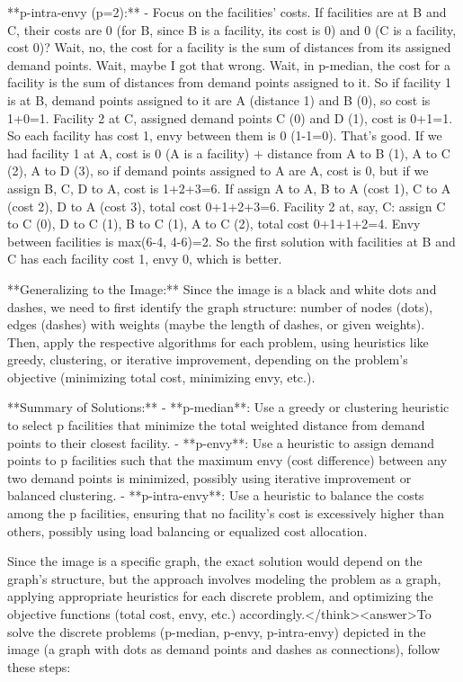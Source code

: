 **p-intra-envy (p=2):**
- Focus on the facilities' costs. If facilities are at B and C, their costs are 0 (for B, since B is a facility, its cost is 0) and 0 (C is a facility, cost 0)? Wait, no, the cost for a facility is the sum of distances from its assigned demand points. Wait, maybe I got that wrong. Wait, in p-median, the cost for a facility is the sum of distances from demand points assigned to it. So if facility 1 is at B, demand points assigned to it are A (distance 1) and B (0), so cost is 1+0=1. Facility 2 at C, assigned demand points C (0) and D (1), cost is 0+1=1. So each facility has cost 1, envy between them is 0 (1-1=0). That's good. If we had facility 1 at A, cost is 0 (A is a facility) + distance from A to B (1), A to C (2), A to D (3), so if demand points assigned to A are A, cost is 0, but if we assign B, C, D to A, cost is 1+2+3=6. If assign A to A, B to A (cost 1), C to A (cost 2), D to A (cost 3), total cost 0+1+2+3=6. Facility 2 at, say, C: assign C to C (0), D to C (1), B to C (1), A to C (2), total cost 0+1+1+2=4. Envy between facilities is max(6-4, 4-6)=2. So the first solution with facilities at B and C has each facility cost 1, envy 0, which is better.

**Generalizing to the Image:**
Since the image is a black and white dots and dashes, we need to first identify the graph structure: number of nodes (dots), edges (dashes) with weights (maybe the length of dashes, or given weights). Then, apply the respective algorithms for each problem, using heuristics like greedy, clustering, or iterative improvement, depending on the problem's objective (minimizing total cost, minimizing envy, etc.).

**Summary of Solutions:**
- **p-median**: Use a greedy or clustering heuristic to select p facilities that minimize the total weighted distance from demand points to their closest facility.
- **p-envy**: Use a heuristic to assign demand points to p facilities such that the maximum envy (cost difference) between any two demand points is minimized, possibly using iterative improvement or balanced clustering.
- **p-intra-envy**: Use a heuristic to balance the costs among the p facilities, ensuring that no facility's cost is excessively higher than others, possibly using load balancing or equalized cost allocation.

Since the image is a specific graph, the exact solution would depend on the graph's structure, but the approach involves modeling the problem as a graph, applying appropriate heuristics for each discrete problem, and optimizing the objective functions (total cost, envy, etc.) accordingly.</think><answer>To solve the discrete problems (p-median, p-envy, p-intra-envy) depicted in the image (a graph with dots as demand points and dashes as connections), follow these steps:  


